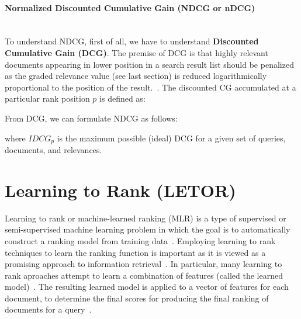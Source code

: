 \paragraph{Normalized Discounted Cumulative Gain (NDCG or nDCG)} \hspace{0pt} \\
To understand NDCG, first of all, we have to understand \textbf{Discounted Cumulative Gain (DCG)}. 
The premise of DCG is that highly relevant documents appearing in lower position in a search result list should be penalized as 
the graded relevance value (see last section) is 
reduced logarithmically proportional to the position of the result.~\cite{ndcg}. The discounted CG accumulated at a particular rank position
$p$ is defined as:

\begin{center}
\end{center}

From DCG, we can formulate NDCG as follows:
\begin{center}
\end{center}
where $IDCG_p$ is the maximum possible (ideal) DCG for a given set of queries, documents, and relevances.


\section{Learning to Rank (LETOR)}\label{sec:letor}
Learning to rank or machine-learned ranking (MLR) is a type of supervised or semi-supervised machine learning problem in which the goal is 
to automatically construct a ranking model from training data~\cite{letor}.
Employing learning to rank techniques to learn the ranking function is important as it is viewed as
a promising approach to information retrieval~\cite{letor}. In particular, many learning to rank aproaches attempt to learn a combination of features
(called the learned model)~\cite[P. 3]{learningmodel}. The resulting learned model is applied to a vector of features for each document, to determine the final scores for 
producing the final ranking of documents for a query~\cite[P. 3]{learningmodel}.

